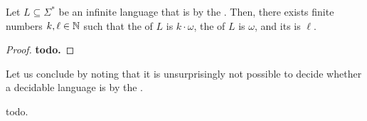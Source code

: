 \begin{corollary}
    Let $L \subseteq \Sigma^*$ be an infinite language that is  by
    the . Then, there exists finite numbers $k,\ell \in \mathbb{N}$ such that
    the
     of $L$ is $k \cdot \omega$,
    the  of $L$ is $\omega$, and its
     is $\ell$.
\end{corollary}
\begin{proof}
    \textbf{todo.}
\end{proof}

Let us conclude by noting that it is unsurprisingly not possible to decide
whether a decidable language is  by the .

\begin{lemma}
    todo.
\end{lemma}
